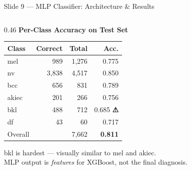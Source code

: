 \documentclass[aspectratio=169, 9pt]{beamer}
\begin{document}
\begin{frame}{Slide 9 --- MLP Classifier: Architecture \& Results}
\begin{columns}[T]
    \begin{column}{0.46\textwidth}
      \textbf{\color{navyblue}Per-Class Accuracy on Test Set}

      \vspace{0.2em}
      {\small
      \begin{tabular}{@{} l r r r @{}}
        \toprule
        Class & Correct & Total & Acc. \\
        \midrule
        {\color{darkred}mel}   &   989 & 1,276 & 0.775 \\
        {\color{teal}nv}       & 3,838 & 4,517 & 0.850 \\
        {\color{darkred}bcc}   &   656 &   831 & 0.789 \\
        {\color{darkred}akiec} &   201 &   266 & 0.756 \\
        {\color{teal}bkl}      &   488 &   712 & 0.685 \textbf{⚠} \\
        {\color{teal}df}       &    43 &    60 & 0.717 \\
        \midrule
        Overall & \multicolumn{2}{r}{7,662} & \textbf{0.811} \\
        \bottomrule
      \end{tabular}
      }

      \vspace{0.2em}
      {\scriptsize\color{gray}
      bkl is hardest --- visually similar to mel and akiec.\\
      MLP output is \textit{features} for XGBoost, not the final diagnosis.}
    \end{column}

  \end{columns}
\end{frame}
\end{document}
